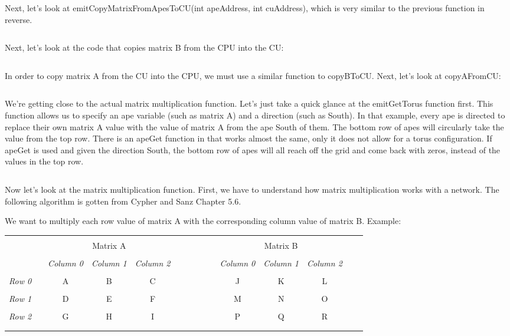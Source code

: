 \documentclass[10pt]{article}
\begin{document}
Next, let’s look at emitCopyMatrixFromApesToCU(int apeAddress, int cuAddress), which is very similar to the previous function in reverse.

\inputminted{c}{mm-emitCopyMatrixFromApesToCU.c}

Next, let’s look at the code that copies matrix B from the CPU into the CU: \par

\inputminted{c}{mm-copyBToCU.c}

In order to copy matrix A from the CU into the CPU, we must use a similar function to copyBToCU.  Next, let’s look at copyAFromCU: \par

\inputminted{c}{mm-copyAFromCU.c}

We’re getting close to the actual matrix multiplication function.  Let’s just take a quick glance at the emitGetTorus function first.  This function allows us to specify an ape variable (such as matrix A) and a direction (such as South).  In that example, every ape is directed to replace their own matrix A value with the value of matrix A from the ape South of them.  The bottom row of apes will circularly take the value from the top row.  There is an apeGet function in that works almost the same, only it does not allow for a torus configuration.  If apeGet is used and given the direction South, the bottom row of apes will all reach off the grid and come back with zeros, instead of the values in the top row.

\inputminted{c}{mm-emitGetTorus.c}

Now let’s look at the matrix multiplication function.  First, we have to understand how matrix multiplication works with a network.  The following algorithm is gotten from Cypher and Sanz Chapter 5.6. \par
We want to multiply each row value of matrix A with the corresponding column value of matrix B.  Example: \par

\begin{tabular}{l*{13}{c}r}
  \\
  \\
  & & & Matrix A & & & & & & & & Matrix B & \\
  \\
  & &
  \textit{Column 0} &
  \textit{Column 1} &
  \textit{Column 2} & & & & & &
  \textit{Column 0} &
  \textit{Column 1} &
  \textit{Column 2}\\
  \\
  \textit{Row 0} & & A & B & C & & & & & & J & K & L \\
  \\
  \textit{Row 1} & & D & E & F & & & & & & M & N & O \\
  \\
  \textit{Row 2} & & G & H & I & & & & & & P & Q & R\\
  \\
  \\
\end{tabular}
\end{document}
